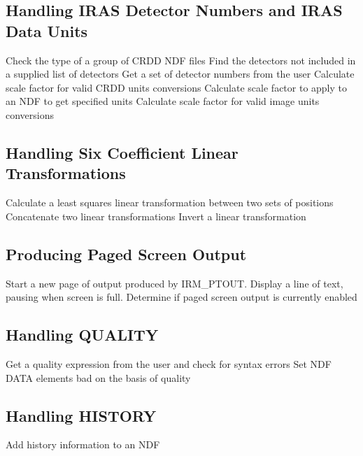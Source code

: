 \subsection {Handling IRAS Detector Numbers and IRAS Data Units}
  {Check the type of a group of CRDD NDF files}
  {Find the detectors not included in a supplied list of detectors}
  {Get a set of detector numbers from the user}
  {Calculate scale factor for valid CRDD units conversions}
  {Calculate scale factor to apply to an NDF to get specified units}
  {Calculate scale factor for valid image units conversions}


\subsection {Handling Six Coefficient Linear Transformations}
  {Calculate a least squares linear transformation between two sets of 
   positions}
  {Concatenate two linear transformations}
  {Invert a linear transformation}


\subsection{Producing Paged Screen Output}
  {Start a new page of output produced by IRM\_PTOUT.}
  {Display a line of text, pausing when screen is full.}
  {Determine if paged screen output is currently enabled}

\subsection {Handling QUALITY}
  {Get a quality expression from the user and check for syntax errors}
  {Set NDF DATA elements bad on the basis of quality}


\subsection {Handling HISTORY}
  {Add history information to an NDF}


